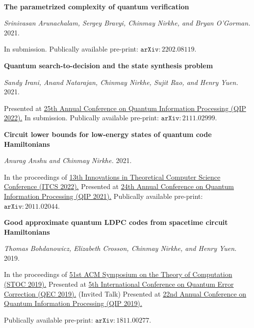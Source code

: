 \documentclass{article}
\begin{document}
\
\begin{enumerate}[{leftmargin=*,start=8,label=[\arabic*]\addtocounter{enumi}{-2}}]

\item \textbf{The parametrized complexity of quantum verification}

\emph{Srinivasan Arunachalam, Sergey Bravyi, Chinmay Nirkhe, and Bryan O'Gorman.} 2021.

In submission. Publically available pre-print: \href{https://arxiv.org/abs/2202.08119}{$\mathtt{arXiv:2202.08119}$}.

\item \textbf{Quantum search-to-decision and the state synthesis problem}

\emph{Sandy Irani, Anand Natarajan, Chinmay Nirkhe, Sujit Rao, and Henry Yuen.} 2021.

Presented at \href{https://web.cvent.com/event/8adf8248-432b-499c-91e2-63b83ba3f69e/summary}{25th Annual Conference on Quantum Information Processing (QIP 2022).}
In submission. Publically available pre-print: \href{https://arxiv.org/abs/2111.02999}{$\mathtt{arXiv:2111.02999}$}.

\item \textbf{Circuit lower bounds for low-energy states of quantum code Hamiltonians}

\emph{Anurag Anshu and Chinmay Nirkhe.} 2021.

In the proceedings of \href{http://itcs-conf.org/itcs22/itcs22-cfp.html}{13th Innovations in Theoretical Computer Science Conference (ITCS 2022).}
Presented at \href{https://www.mcqst.de/qip2021/}{24th Annual Conference on Quantum Information Processing (QIP 2021).}
Publically available pre-print: \href{https://arxiv.org/abs/2011.02044}{$\mathtt{arXiv:2011.02044}$}.

\item \textbf{Good approximate quantum LDPC codes from spacetime circuit Hamiltonians}

\emph{Thomas Bohdanowicz, Elizabeth Crosson, Chinmay Nirkhe, and Henry Yuen.} 2019.

In the proceedings of \href{http://acm-stoc.org/stoc2019/}{51st ACM Symposium on the Theory of Computation (STOC 2019).}
Presented at \href{http://qec19.iopconfs.org/home}{5th International Conference on Quantum Error Correction (QEC 2019).} (Invited Talk)
Presented at \href{https://jila.colorado.edu/qip2019/}{22nd Annual Conference on Quantum Information Processing (QIP 2019).}

Publically available pre-print: \href{https://arxiv.org/abs/1811.00277}{$\mathtt{arXiv:1811.00277}$}.


\end{enumerate}
\end{document}
